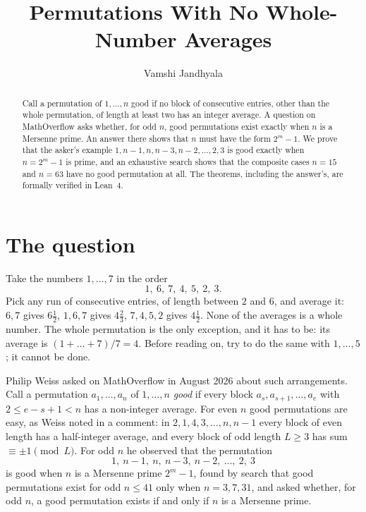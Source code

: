 \documentclass[11pt]{amsart}
\title{Permutations With No Whole-Number Averages}
\author{Vamshi Jandhyala}
\theoremstyle{remark}
\begin{document}
\begin{abstract}
Call a permutation of $1,\dots,n$ good if no block of consecutive entries, other than the whole permutation, of length at least two has an integer average. A question on MathOverflow asks whether, for odd $n$, good permutations exist exactly when $n$ is a Mersenne prime. An answer there shows that $n$ must have the form $2^m-1$. We prove that the asker's example $1,n-1,n,n-3,n-2,\dots,2,3$ is good exactly when $n=2^m-1$ is prime, and an exhaustive search shows that the composite cases $n=15$ and $n=63$ have no good permutation at all. The theorems, including the answer's, are formally verified in Lean~4.
\end{abstract}

\maketitle

\section{The question}

Take the numbers $1,\dots,7$ in the order
\[
1,\ 6,\ 7,\ 4,\ 5,\ 2,\ 3 .
\]
Pick any run of consecutive entries, of length between $2$ and $6$, and average it: $6,7$ gives $6\tfrac12$, $1,6,7$ gives $4\tfrac23$, $7,4,5,2$ gives $4\tfrac12$. None of the averages is a whole number. The whole permutation is the only exception, and it has to be: its average is $(1+\dots+7)/7=4$. Before reading on, try to do the same with $1,\dots,5$; it cannot be done.

Philip Weiss asked on MathOverflow in August 2026 \cite{MO} about such arrangements. Call a permutation $a_1,\dots,a_n$ of $1,\dots,n$ \emph{good} if every block $a_s,a_{s+1},\dots,a_e$ with $2\le e-s+1<n$ has a non-integer average. For even $n$ good permutations are easy, as Weiss noted in a comment: in $2,1,4,3,\dots,n,n-1$ every block of even length has a half-integer average, and every block of odd length $L\ge3$ has sum $\equiv\pm1\pmod L$. For odd $n$ he observed that the permutation
\begin{equation}\label{eq:c}
1,\ n-1,\ n,\ n-3,\ n-2,\ \dots,\ 2,\ 3
\end{equation}
is good when $n$ is a Mersenne prime $2^m-1$, found by search that good permutations exist for odd $n\le41$ only when $n=3,7,31$, and asked whether, for odd $n$, a good permutation exists if and only if $n$ is a Mersenne prime.
\end{document}

